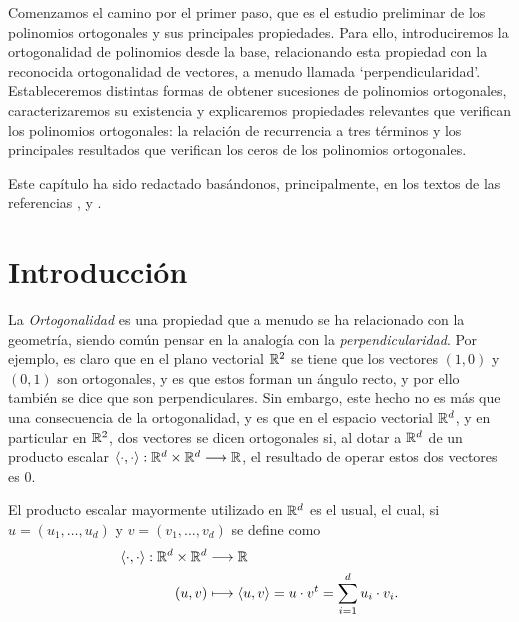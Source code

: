 

Comenzamos el camino por el primer paso, que es el estudio preliminar de los polinomios ortogonales y sus principales propiedades. Para ello, introduciremos la ortogonalidad de polinomios desde la base, relacionando esta propiedad con la reconocida ortogonalidad de vectores, a menudo llamada `perpendicularidad'. Estableceremos distintas formas de obtener sucesiones de polinomios ortogonales, caracterizaremos su existencia y explicaremos propiedades relevantes que verifican los polinomios ortogonales: la relación de recurrencia a tres términos y los principales resultados que verifican los ceros de los polinomios ortogonales.

Este capítulo ha sido redactado basándonos, principalmente, en los textos de las referencias \cite[Ch. II]{renato}, \cite[Ch. I]{chihara} y \cite[Ch. II, III]{szego}.

\section{Introducción}
\label{c1section:intro}

La \textit{Ortogonalidad} es una propiedad que a menudo se ha relacionado con la geometría, siendo común pensar en la analogía con la \textit{perpendicularidad}. Por ejemplo, es claro que en el plano vectorial $\mathbb{R}^2$ se tiene que los vectores $(1,0)$ y $(0,1)$ son ortogonales, y es que estos forman un ángulo recto, y por ello también se dice que son perpendiculares. Sin embargo, este hecho no es más que una consecuencia de la ortogonalidad, y es que en el espacio vectorial $\mathbb{R}^d$, y en particular en $\mathbb{R}^2$, dos vectores se dicen ortogonales si, al dotar a $\mathbb{R}^d$ de un producto escalar $\left\langle\cdot,\cdot\right\rangle:\mathbb{R}^d\times\mathbb{R}^d\longrightarrow \mathbb{R}$, el resultado de operar estos dos vectores es $0$.

El producto escalar mayormente utilizado en $\mathbb{R}^d$ es el usual, el cual, si $u=(u_1,\dots,u_d)$ y $v=(v_1,\dots,v_d)$ se define como
\begin{equation*}
    \begin{split}
        \left\langle\cdot,\cdot\right\rangle:\mathbb{R}^d\times\mathbb{R}^d &\longrightarrow \mathbb{R} \\
        (u,v)&\longmapsto \left\langle u, v \right\rangle=u\cdot v^t = \sum_{i=1}^d u_i\cdot v_i.
    \end{split}
\end{equation*}

